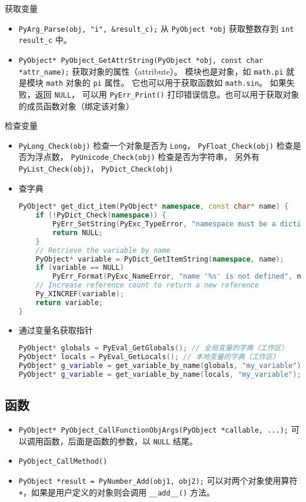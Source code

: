获取变量
\begin{itemize}
\item \verb`PyArg_Parse(obj, "i", &result_c);` 从 \verb`PyObject *obj` 获取整数存到 \verb`int result_c` 中。
\item \verb`PyObject* PyObject_GetAttrString(PyObject *obj, const char *attr_name);` 获取对象的属性（attribute）。 模块也是对象，如 \verb`math.pi` 就是模块 \verb`math` 对象的 \verb`pi` 属性。 它也可以用于获取函数如 \verb`math.sin`。 如果失败，返回 \verb`NULL`， 可以用 \verb`PyErr_Print()` 打印错误信息。也可以用于获取对象的成员函数对象（绑定该对象）
\end{itemize}

检查变量
\begin{itemize}
\item \verb`PyLong_Check(obj)` 检查一个对象是否为 \verb`Long`， \verb`PyFloat_Check(obj)` 检查是否为浮点数， \verb`PyUnicode_Check(obj)` 检查是否为字符串， 另外有 \verb`PyList_Check(obj)`， \verb`PyDict_Check(obj)`
\item 查字典
\begin{lstlisting}[language=cpp]
PyObject* get_dict_item(PyObject* namespace, const char* name) {
    if (!PyDict_Check(namespace)) {
        PyErr_SetString(PyExc_TypeError, "namespace must be a dictionary");
        return NULL;
    }
    // Retrieve the variable by name
    PyObject* variable = PyDict_GetItemString(namespace, name);
    if (variable == NULL)
        PyErr_Format(PyExc_NameError, "name '%s' is not defined", name);
    // Increase reference count to return a new reference
    Py_XINCREF(variable);
    return variable;
}
\end{lstlisting}
\item 通过变量名获取指针
\begin{lstlisting}[language=cpp]
PyObject* globals = PyEval_GetGlobals(); // 全局变量的字典（工作区）
PyObject* locals = PyEval_GetLocals(); // 本地变量的字典（工作区）
PyObject* g_variable = get_variable_by_name(globals, "my_variable");
PyObject* g_variable = get_variable_by_name(locals, "my_variable");
\end{lstlisting}
\end{itemize}


\subsection{函数}
\begin{itemize}
\item \verb`PyObject* PyObject_CallFunctionObjArgs(PyObject *callable, ...);` 可以调用函数，后面是函数的参数，以 \verb`NULL` 结尾。
\item \verb`PyObject_CallMethod()`
\item \verb`PyObject *result = PyNumber_Add(obj1, obj2);` 可以对两个对象使用算符 \verb`+`，如果是用户定义的对象则会调用 \verb`__add__()` 方法。
\end{itemize}

